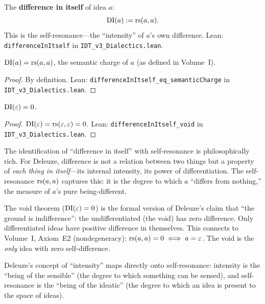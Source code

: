 \begin{definition}
\label{def:difference-in-itself}
The \textbf{difference in itself} of idea $a$:
\[
\mathrm{DI}(a) := \mathrm{rs}(a, a).
\]
This is the self-resonance---the ``intensity'' of $a$'s own difference.
Lean: \texttt{differenceInItself} in \texttt{IDT\_v3\_Dialectics.lean}.
\end{definition}

\begin{theorem}
\label{thm:di-charge}
$\mathrm{DI}(a) = \mathrm{rs}(a, a)$, the semantic charge of $a$ (as defined in
Volume~I).
\end{theorem}

\begin{proof}
By definition. Lean: \texttt{differenceInItself\_eq\_semanticCharge} in
\texttt{IDT\_v3\_Dialectics.lean}.
\end{proof}

\begin{theorem}
\label{thm:void-difference}
$\mathrm{DI}(\varepsilon) = 0$.
\end{theorem}

\begin{proof}
$\mathrm{DI}(\varepsilon) = \mathrm{rs}(\varepsilon, \varepsilon) = 0$.
Lean: \texttt{differenceInItself\_void} in
\texttt{IDT\_v3\_Dialectics.lean}.
\end{proof}

\begin{interpretation}
The identification of ``difference in itself'' with self-resonance is
philosophically rich. For Deleuze, difference is not a relation between
two things but a property of \emph{each thing in itself}---its internal
intensity, its power of differentiation. The self-resonance $\mathrm{rs}(a, a)$
captures this: it is the degree to which $a$ ``differs from nothing,''
the measure of $a$'s pure being-different.

The void theorem ($\mathrm{DI}(\varepsilon) = 0$) is the formal version of
Deleuze's claim that ``the ground is indifference'': the undifferentiated
(the void) has zero difference. Only differentiated ideas have positive
difference in themselves. This connects to Volume~I, Axiom~E2
(nondegeneracy): $\mathrm{rs}(a, a) = 0 \iff a = \varepsilon$. The void is the
\emph{only} idea with zero self-difference.

Deleuze's concept of ``intensity'' maps directly onto self-resonance:
intensity is the ``being of the sensible'' (the degree to which something
can be sensed), and self-resonance is the ``being of the ideatic''
(the degree to which an idea is present to the space of ideas).
\end{interpretation}

